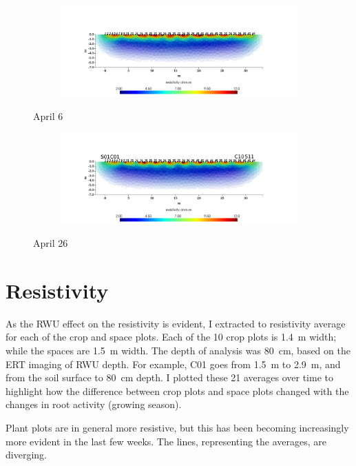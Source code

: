 \documentclass[a4paper,12pt]{article}
\begin{document}
\begin{figure}[p]
\centering
\begin{subfigure}{\textwidth}
\includegraphics[width=\textwidth]{April06.png}
\end{subfigure}
\caption{April 6}
\end{figure}

\begin{figure}[p]
\centering
\begin{subfigure}{\textwidth}
\includegraphics[width=\textwidth]{April26.png}
\end{subfigure}
\caption{April 26}
\end{figure}

\section{Resistivity}
As the RWU effect on the resistivity is evident, I extracted to resistivity average for each of the crop and space plots.
Each of the 10 crop plots is \SI{1.4}{\meter} width; while the spaces are \SI{1.5}{\meter} width.
The depth of analysis was \SI{80}{\centi\meter}, based on the ERT imaging of RWU depth.
For example, C01 goes from \SI{1.5}{\meter} to \SI{2.9}{\meter}, and from the soil surface to \SI{80}{\centi\meter} depth.
I plotted these 21 averages over time to highlight how the difference between crop plots and space plots changed with the changes in root activity (growing season).

Plant plots are in general more resistive, but this has been becoming increasingly more evident in the last few weeks.
The lines, representing the averages, are diverging.
\end{document}
